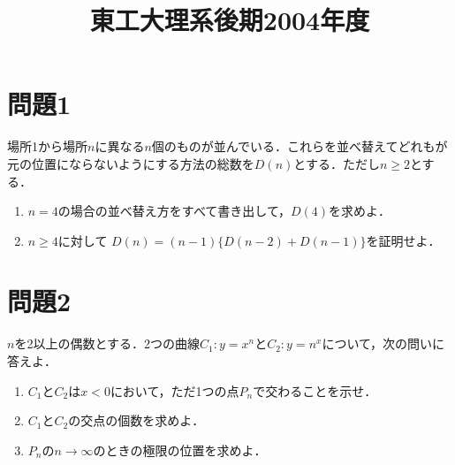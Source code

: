 \documentclass[unicode,12pt, a4paper]{ltjsarticle}%
\title{東工大理系後期2004年度}
\begin{document}
\maketitle
\section{問題1}
場所1から場所$n$に異なる$n$個のものが並んでいる．これらを並べ替えてどれもが元の位置にならないようにする方法の総数を$D(n)$とする．ただし$n \ge 2$とする．

\begin{enumerate}
    \item $n=4$の場合の並べ替え方をすべて書き出して，$D(4)$を求めよ．
    \item $n \ge 4$に対して $D(n)=(n-1)\{D(n-2)+D(n-1)\}$を証明せよ．
\end{enumerate}


\section{問題2}
$n$を2以上の偶数とする．2つの曲線$C_1: y=x^n$と$C_2: y=n^x$について，次の問いに答えよ．

\begin{enumerate}
    \item $C_1$と$C_2$は$x<0$において，ただ1つの点$P_n$で交わることを示せ．
    \item $C_1$と$C_2$の交点の個数を求めよ．
    \item $P_n$の$n \to \infty$のときの極限の位置を求めよ．
\end{enumerate}
\end{document}
